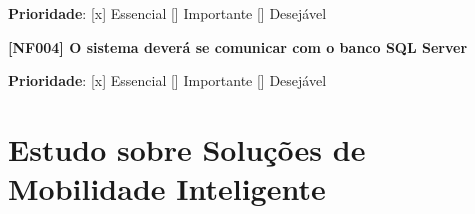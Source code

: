 \textbf{Prioridade}:      [x] Essencial        [] Importante     [] Desejável 





\textbf{[NF004] O sistema deverá se comunicar com o banco SQL Server}

\textbf{Prioridade}:      [x] Essencial        [] Importante     [] Desejável 

\section{Estudo sobre Soluções de Mobilidade Inteligente}

